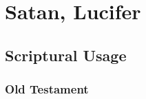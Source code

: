 \section{Satan, Lucifer}
	\label{SATAN}
	\label{LUCIFER}
	





\subsection{Scriptural Usage} %
	\label{SATAN-SCRIPTURES}

	\subsubsection{Old Testament} %
		\label{SATAN-OT}
	
	
